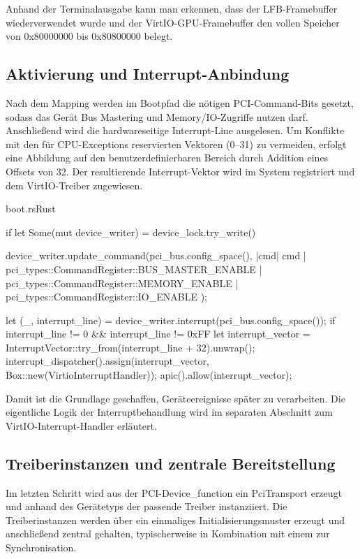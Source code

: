 Anhand der Terminalausgabe kann man erkennen, dass der LFB-Framebuffer wiederverwendet wurde und der VirtIO-GPU-Framebuffer den vollen Speicher von 0x80000000 bis 0x80800000 belegt.

\subsection{Aktivierung und Interrupt-Anbindung}

Nach dem Mapping werden im Bootpfad die nötigen PCI-Command-Bits gesetzt, sodass das Gerät Bus Mastering und Memory/IO-Zugriffe nutzen darf. Anschließend wird die hardwareseitige Interrupt-Line ausgelesen. Um Konflikte mit den für CPU-Exceptions reservierten Vektoren (0–31) zu vermeiden, erfolgt eine Abbildung auf den benutzerdefinierbaren Bereich durch Addition eines Offsets von 32. Der resultierende Interrupt-Vektor wird im System registriert und dem VirtIO-Treiber zugewiesen.

\begin{codeblock}{boot.rs}{Rust}
  \begin{rustcode}
if let Some(mut device_writer) = device_lock.try_write() {
    device_writer.update_command(pci_bus.config_space(), |cmd| {
        cmd | pci_types::CommandRegister::BUS_MASTER_ENABLE
            | pci_types::CommandRegister::MEMORY_ENABLE
            | pci_types::CommandRegister::IO_ENABLE
    });

    let (_, interrupt_line) = device_writer.interrupt(pci_bus.config_space());
    if interrupt_line != 0 && interrupt_line != 0xFF {
        let interrupt_vector = InterruptVector::try_from(interrupt_line + 32).unwrap();
        interrupt_dispatcher().assign(interrupt_vector, Box::new(VirtioInterruptHandler));
        apic().allow(interrupt_vector);
    }
}
  \end{rustcode}
\end{codeblock}

Damit ist die Grundlage geschaffen, Geräteereignisse später zu verarbeiten. Die eigentliche Logik der Interruptbehandlung wird im separaten Abschnitt zum VirtIO-Interrupt-Handler erläutert.

\subsection{Treiberinstanzen und zentrale Bereitstellung}

Im letzten Schritt wird aus der PCI-Device\_function ein PciTransport erzeugt und anhand des Gerätetyps der passende Treiber instanziiert. Die Treiberinstanzen werden über ein einmaliges Initialisierungsmuster  erzeugt und anschließend zentral gehalten, typischerweise in Kombination mit einem  zur Synchronisation.

